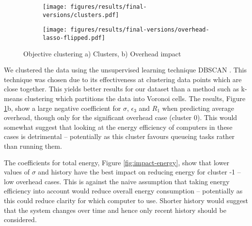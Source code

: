 \documentclass[10pt, conference, compsocconf]{IEEEtran}
\begin{document}
\begin{figure}[!b]
\vskip -12pt
\centering
\begin{subfigure}{}
\centering
\texttt{[image: figures/results/final-versions/clusters.pdf]}%
\hfil
\end{subfigure}
%
\begin{subfigure}{}
\centering
\texttt{[image: figures/results/final-versions/overhead-lasso-flipped.pdf]}%
\hfil
\end{subfigure}
%
\vskip -8pt	
\caption{Objective clustering a) Clusters, b) Overhead impact}
\label{fig:clustering}
\end{figure}
We clustered the data using the unsupervised learning technique DBSCAN \cite{Ester:1996:DAD:3001460.3001507}. This technique was chosen due to its effectiveness at clustering data points which are close together. This yields better results for our dataset than a method such as k-means clustering which partitions the data into Voronoi cells. The results, Figure \ref{fig:clustering}b, show a large negative coefficient for $\sigma$, $\epsilon_3$ and $R_1$ when predicting average overhead, though only for the significant overhead case (cluster 0). This would somewhat suggest that looking at the energy efficiency of computers in these cases is detrimental -- potentially as this cluster favours queueing tasks rather than running them.


The coefficients for total energy, Figure \ref{fig:impact-energy}, show that lower values of $\sigma$ and history have the best impact on reducing energy for cluster -1 -- low overhead cases. This is against the naive assumption that taking energy efficiency into account would reduce overall energy consumption -- potentially as this could reduce clarity for which computer to use. Shorter history would suggest that the system changes over time and hence only recent history should be considered.
\end{document}
